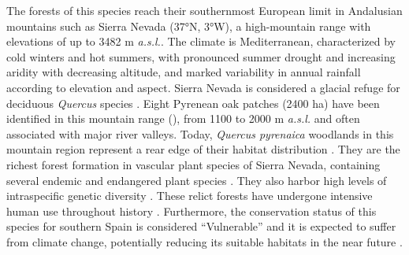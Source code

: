 The forests of this species reach their southernmost European limit in Andalusian mountains such as Sierra Nevada (37°N, 3°W), a high-mountain range with elevations of up to 3482 m \emph{a.s.l.}. The climate is Mediterranean, characterized by cold winters and hot summers, with pronounced summer drought and increasing aridity with decreasing altitude, and marked variability in annual rainfall according to elevation and aspect. Sierra Nevada is considered a glacial refuge for deciduous \emph{Quercus} species \autocite{Olaldeetal2002WhiteOaks}. Eight Pyrenean oak patches (2400 ha) have been identified in this mountain range (), from 1100 to 2000 m \emph{a.s.l.} and often associated with major river valleys. Today, \emph{Quercus pyrenaica} woodlands in this mountain region represent a rear edge of their habitat distribution \autocite{HampePetit2005ConservingBiodiversity}. They are the richest forest formation in vascular plant species of Sierra Nevada, containing several endemic and endangered plant species \autocite{Loriteetal2008PhytosociologicalReview}. They also harbor high levels of intraspecific genetic diversity \autocite{ValbuenaCarabanaGil2013GeneticResilience}. These relict forests have undergone intensive human use throughout history \autocite{CamachoOlmedoetal2002DinamicaEvolutiva}. Furthermore, the conservation status of this species for southern Spain is considered ``Vulnerable'' and it is expected to suffer from climate change, potentially reducing its suitable habitats in the near future \autocite{GeaIzquierdoetal2013GrowthProjections,GeaIzquierdoetal2017RiskyFuture}.

